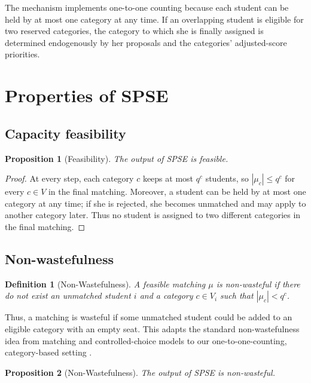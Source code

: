 \documentclass[10pt]{article}
\newtheorem{definition}{Definition}
\newtheorem{proposition}{Proposition}
\newcommand{\1}{\mathbf{1}}
\begin{document}
The mechanism implements one-to-one counting because each student can be held by at most one category at any time. If an overlapping student is eligible for two reserved categories, the category to which she is finally assigned is determined endogenously by her proposals and the categories' adjusted-score priorities.

\section{Properties of SPSE}

\subsection{Capacity feasibility}

\begin{proposition}[Feasibility]
\label{prop:feasibility}
The output of SPSE is feasible.
\end{proposition}

\begin{proof}
At every step, each category $c$ keeps at most $q^c$ students, so $|\mu_c|\le q^c$ for every $c\in V$ in the final matching. Moreover, a student can be held by at most one category at any time; if she is rejected, she becomes unmatched and may apply to another category later. Thus no student is assigned to two different categories in the final matching.
\end{proof}

\subsection{Non-wastefulness}

\begin{definition}[Non-Wastefulness]
A feasible matching $\mu$ is non-wasteful if there do not exist an unmatched student $i$ and a category $c\in V_i$ such that $|\mu_c|<q^c$.
\end{definition}

Thus, a matching is wasteful if some unmatched student could be added to an eligible category with an empty seat. This adapts the standard non-wastefulness idea from matching and controlled-choice models to our one-to-one-counting, category-based setting \citep{EHYY14a,GKK+17a,KHIY17a}.

\begin{proposition}[Non-Wastefulness]
\label{prop:nonwastefulness}
The output of SPSE is non-wasteful.
\end{proposition}
\end{document}
